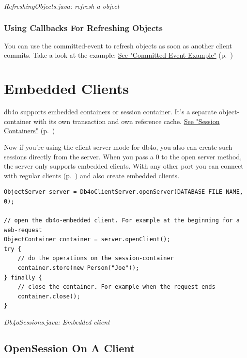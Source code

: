 {\small\itshape RefreshingObjects.java: refresh a object\par}
\medskip

\subsubsection*{Using Callbacks For Refreshing Objects}

You can use the committed-event to refresh objects as soon as another client commits. Take a look at the example: \hyperref[ref:advanced-topics-callbacks-possible-usecases-committed-event-example]{See "Committed Event Example"} (p.~\pageref{ref:advanced-topics-callbacks-possible-usecases-committed-event-example})

\section{Embedded Clients}
\label{ref:client-server-embedded}

db4o supports embedded containers or session container. It's a separate object-container with its own transaction and own reference cache. \hyperref[ref:advanced-topics-session-containers]{See "Session Containers"} (p.~\pageref{ref:advanced-topics-session-containers})

Now if you're using the client-server mode for db4o, you also can create such sessions directly from the server. When you pass a 0 to the open server method, the server only supports embedded clients. With any other port you can connect with \hyperref[ref:client-server]{regular clients} (p.~\pageref{ref:client-server}) and also create embedded clients.

\begin{lstlisting}
ObjectServer server = Db4oClientServer.openServer(DATABASE_FILE_NAME, 0);

// open the db4o-embedded client. For example at the beginning for a web-request
ObjectContainer container = server.openClient();
try {
    // do the operations on the session-container
    container.store(new Person("Joe"));
} finally {
    // close the container. For example when the request ends
    container.close();
}
\end{lstlisting}

{\small\itshape Db4oSessions.java: Embedded client\par}
\medskip

\subsection*{OpenSession On A Client}

